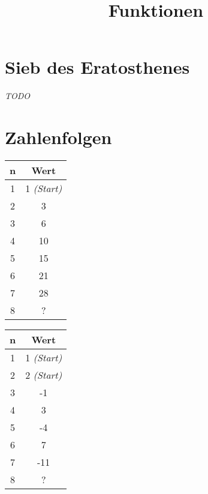 

\title{Funktionen}

\ihead{}
\chead{}
\ohead{}
\ifoot{}
\cfoot{\pagemark}
\ofoot{}



\setlength{\parskip}{1em}
\setlength{\parindent}{0em}
\renewcommand{\baselinestretch}{1.15}



\docheader

\section{Sieb des Eratosthenes}

\textit{TODO}


\section{Zahlenfolgen}

\renewcommand{\arraystretch}{1.5}
\begin{table}[h!]
	\centering
	\begin{tabular}{|c|c|}
		\hline
		\textbf{n} & \textbf{Wert} \\
		\hline
		1 & 1 \small{\textit{(Start)}} \\
		\hline
		2 & 3 \\
		\hline
		3 & 6 \\
		\hline
		4 & 10 \\
		\hline
		5 & 15 \\
		\hline
		6 & 21 \\
		\hline
		7 & 28 \\
		\hline
		8 & ? \\
		\hline
	\end{tabular}
	\hspace{1em}
	\begin{tabular}{|c|c|}
		\hline
		\textbf{n} & \textbf{Wert} \\
		\hline
		1 & 1 \small{\textit{(Start)}} \\
		\hline
		2 & 2 \small{\textit{(Start)}} \\
		\hline
		3 & -1 \\
		\hline
		4 & 3 \\
		\hline
		5 & -4 \\
		\hline
		6 & 7 \\
		\hline
		7 & -11 \\
		\hline
		8 & ? \\
		\hline
	\end{tabular}
\end{table}
\renewcommand{\arraystretch}{1}


